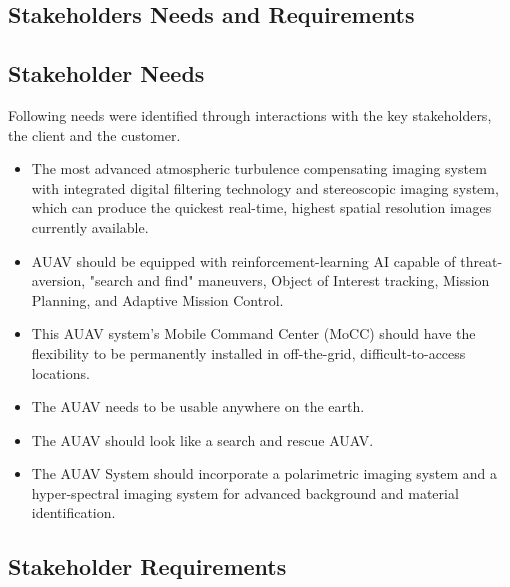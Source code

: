 \begin{fullwidth}
\section{Stakeholders Needs and Requirements}
\subsection{Stakeholder Needs}
Following needs were identified through interactions with the key stakeholders, the client and the customer.
\begin{itemize}
    \item{The most advanced atmospheric turbulence compensating imaging system with integrated digital filtering technology and stereoscopic imaging system, which can produce the quickest real-time, highest spatial resolution images currently available.}
    \item{AUAV should be equipped with reinforcement-learning AI capable of threat-aversion, "search and find" maneuvers, Object of Interest tracking, Mission Planning, and Adaptive Mission Control.}
    \item{This AUAV system's Mobile Command Center (MoCC) should have the flexibility to be permanently installed in off-the-grid, difficult-to-access locations.}
    \item{The AUAV needs to be usable anywhere on the earth.}
    \item{The AUAV should look like a search and rescue AUAV.}
    \item{The AUAV System should incorporate a polarimetric imaging system and a hyper-spectral imaging system for advanced background and material identification.}
\end{itemize}
 
\subsection{Stakeholder Requirements}

\end{fullwidth}
